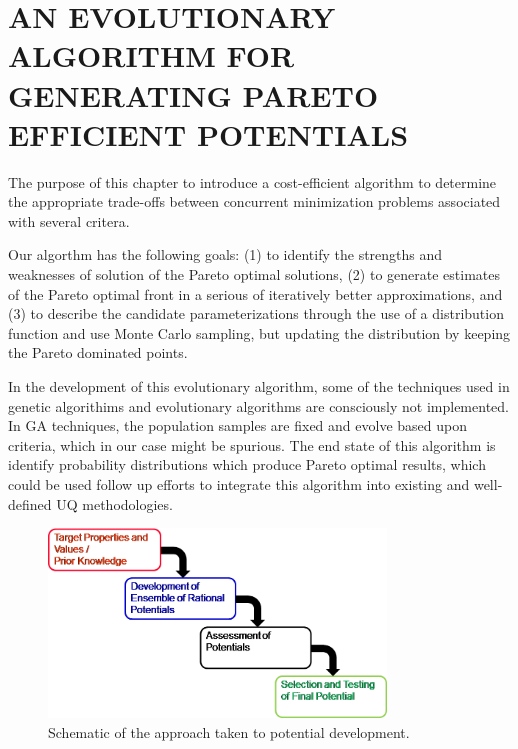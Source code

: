 \chapter{AN EVOLUTIONARY ALGORITHM FOR GENERATING PARETO EFFICIENT POTENTIALS}
\label{chapter:methodology}

The purpose of this chapter to introduce a cost-efficient algorithm to determine the appropriate trade-offs between concurrent minimization problems associated with several critera.

Our algorthm has the following goals: (1) to identify the strengths and weaknesses of solution of the Pareto optimal solutions, (2) to generate estimates of the Pareto optimal front in a serious of iteratively better approximations, and (3) to describe the candidate parameterizations through the use of a distribution function and use Monte Carlo sampling, but updating the distribution by keeping the Pareto dominated points.

In the development of this evolutionary algorithm, some of the techniques used in genetic algorithims and evolutionary algorithms are consciously not implemented.  In GA techniques, the population samples are fixed and evolve based upon criteria, which in our case might be spurious.  The end state of this algorithm is identify probability distributions which produce Pareto optimal results, which could be used follow up efforts to integrate this algorithm into existing and well-defined UQ methodologies.

\begin{figure}[ht]
	\centering
  \includegraphics[width=0.8\textwidth]{chapter5/fig_pareto_schematic}
  \caption{Schematic of the approach taken to potential development.}
  \label{fig:pareto_schematic}
\end{figure}


